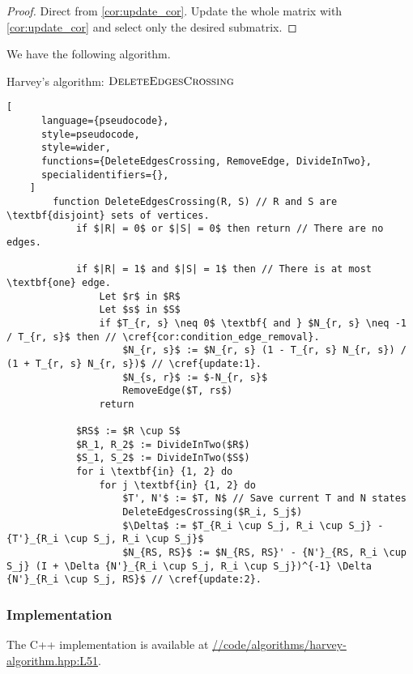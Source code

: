 \begin{proof}
    Direct from \cref{cor:update_cor}. Update the whole matrix with \ref{cor:update_cor} and select only the desired submatrix.
\end{proof}

We have the following algorithm.

\begin{programruledcaption}{Harvey's algorithm: \(\textsc{DeleteEdgesCrossing}\)}
    \begin{lstlisting}[
      language={pseudocode},
      style=pseudocode,
      style=wider,
      functions={DeleteEdgesCrossing, RemoveEdge, DivideInTwo},
      specialidentifiers={},
    ]
        function DeleteEdgesCrossing(R, S) // R and S are \textbf{disjoint} sets of vertices.
            if $|R| = 0$ or $|S| = 0$ then return // There are no edges.

            if $|R| = 1$ and $|S| = 1$ then // There is at most \textbf{one} edge.
                Let $r$ in $R$
                Let $s$ in $S$
                if $T_{r, s} \neq 0$ \textbf{ and } $N_{r, s} \neq -1 / T_{r, s}$ then // \cref{cor:condition_edge_removal}.
                    $N_{r, s}$ := $N_{r, s} (1 - T_{r, s} N_{r, s}) / (1 + T_{r, s} N_{r, s})$ // \cref{update:1}.
                    $N_{s, r}$ := $-N_{r, s}$
                    RemoveEdge($T, rs$)
                return

            $RS$ := $R \cup S$
            $R_1, R_2$ := DivideInTwo($R$)
            $S_1, S_2$ := DivideInTwo($S$)
            for i \textbf{in} {1, 2} do
                for j \textbf{in} {1, 2} do
                    $T', N'$ := $T, N$ // Save current T and N states
                    DeleteEdgesCrossing($R_i, S_j$)
                    $\Delta$ := $T_{R_i \cup S_j, R_i \cup S_j} - {T'}_{R_i \cup S_j, R_i \cup S_j}$
                    $N_{RS, RS}$ := $N_{RS, RS}' - {N'}_{RS, R_i \cup S_j} (I + \Delta {N'}_{R_i \cup S_j, R_i \cup S_j})^{-1} \Delta {N'}_{R_i \cup S_j, RS}$ // \cref{update:2}.
    \end{lstlisting}
\end{programruledcaption}

\subsubsection{Implementation}
\noindent
The C++ implementation is available at 
\href{https://github.com/antoniomsah/algebraic-max-matching/blob/main/code/algorithms/harvey-algorithm.hpp#L51}{//code/algorithms/harvey-algorithm.hpp:L51}.

